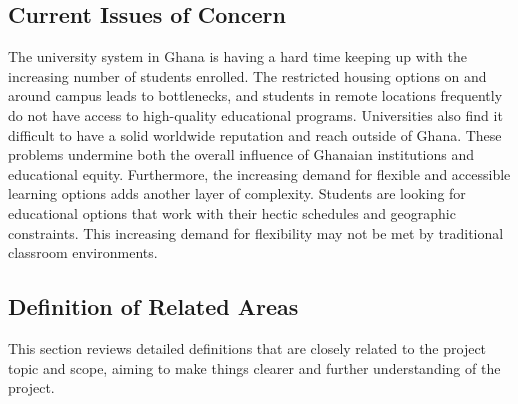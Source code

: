 \documentclass[a4paper,12pt]{article}  %
\begin{document}
\subsection{Current Issues of Concern}
The university system in Ghana is having a hard time keeping up with the
increasing number of students enrolled. The restricted housing options on and
around campus leads to bottlenecks, and students in remote locations frequently
do not have access to high-quality educational programs. Universities also find
it difficult to have a solid worldwide reputation and reach outside of Ghana.
These problems undermine both the overall influence of Ghanaian institutions
and educational equity. Furthermore, the increasing demand for flexible and
accessible learning options adds another layer of complexity. Students are
looking for educational options that work with their hectic schedules and
geographic constraints. This increasing demand for flexibility may not be met
by traditional classroom environments.\\

\subsection{Definition of Related Areas}
This section reviews detailed definitions that are closely related to the
project topic and scope, aiming to make things clearer and further
understanding of the project.\\
\end{document}
